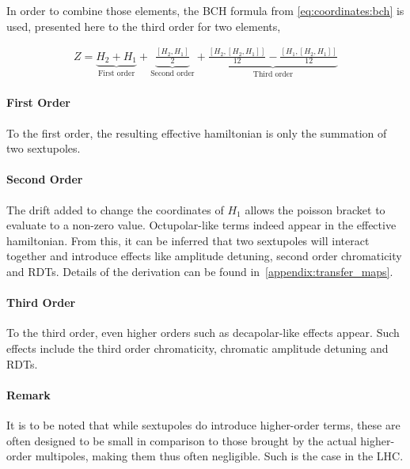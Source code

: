 In order to combine those elements, the BCH formula from \cref{eq:coordinates:bch} is used,
presented here to the third order for two elements,

\small
\begin{equation}
    \begin{aligned}
      Z = \underbrace{H_{2} + H_{1}}_{\text{First order}}
        + \underbrace{\frac{\left[H_{2},H_{1}\right]}{2}}_{\text{Second order}}
        + \underbrace{\frac{\left[H_{2},\left[H_{2},H_{1}\right]\right]}{12} - \frac{\left[H_{1},\left[H_{2},H_{1}\right]\right]}{12}}_{\text{Third order}}
    \end{aligned}
    \label{eq:coordinate_systems:bch_third_order_two_vars}
\end{equation}
\normalsize


\paragraph{First Order}

To the first order, the resulting effective hamiltonian is only the summation of two sextupoles.

\paragraph{Second Order}

The drift added to change the coordinates of $H_1$ allows the poisson bracket to evaluate to a
non-zero value. Octupolar-like terms indeed appear in the effective hamiltonian. From this, it can
be inferred that two sextupoles will interact together and introduce effects like amplitude
detuning, second order chromaticity and RDTs.
Details of the derivation can be found in~\cref{appendix:transfer_maps}.


\paragraph{Third Order}

To the third order, even higher orders such as decapolar-like effects appear. Such effects
include the third order chromaticity, chromatic amplitude detuning and RDTs.

\paragraph{Remark}

It is to be noted that while sextupoles do introduce higher-order terms, these are often designed to
be small in comparison to those brought by the actual higher-order multipoles, making them thus
often negligible. Such is the case in the LHC.